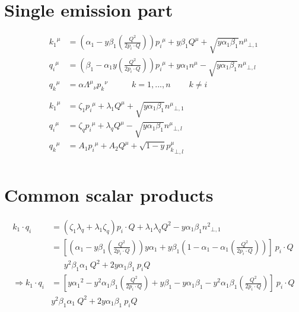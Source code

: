 \section{Single emission part}
\begin{equation}
	\begin{aligned}
	{k_1}^{\mu} &= (\alpha_1 -y\beta_1(\frac{Q^2}{2p_i \cdot Q})) {p_i}^{\mu} + y\beta_1{Q}^{\mu} + \sqrt{y\alpha_1\beta_1}{n^{\mu}}_{\bot,1}  \\
	{q_i}^{\mu}   &= (\beta_1 -\alpha_1 y(\frac{Q^2}{2p_i \cdot Q})){p_i}^{\mu} + y\alpha_1{n}^{\mu} - \sqrt{y\alpha_1\beta_1}{n^{\mu}}_{\bot,l} \\
	{q_k}^{\mu} &= \alpha {\Lambda^{\mu}}_{\nu}{p_k}^{\nu} \:\:\:\:\:\:\:\:\:\:\:\:\: {k=1,...,n}\:\:\:\:\:\:\:\:\:\:k\neq i\\
	\\
	\\
		{k_1}^{\mu} &= \zeta_1 {p_i}^{\mu} + \lambda_1{Q}^{\mu} + \sqrt{y\alpha_1\beta_1}{n^{\mu}}_{\bot,1}  \\
	{q_i}^{\mu}   &= \zeta_q{p_i}^{\mu} + \lambda_q{Q}^{\mu} - \sqrt{y\alpha_1\beta_1}{n^{\mu}}_{\bot,l} \\
	{q_k}^{\mu} &= A_1{p_i}^{\mu} + A_2{Q}^{\mu} + \sqrt{1-y}{p_k^{\mu}}_{\bot,l}\\
    \end{aligned}
\end{equation}
\section{Common scalar products}
\begin{equation}
	\begin{aligned}	
k_1 \cdot q_i &= (\zeta_1 \lambda_q + \lambda_1 \zeta_q)p_i \cdot Q+\lambda_1 \lambda_q Q^2 -y\alpha_1\beta_1 {n^{2}}_{\bot,1}\\
	&=[(\alpha_1 -y\beta_1(\frac{Q^2}{2p_i \cdot Q}))y\alpha_1+y\beta_1(1- \alpha_1 -\alpha_1 (\frac{Q^2}{2p_i \cdot Q}))]\:p_i \cdot Q\\
	&\:\:\:\:\:\:\:y^2\beta_1\alpha_1\: Q^2+2y\alpha_1\beta_1\:p_iQ\\
\Rightarrow	k_1 \cdot q_i &=[y{\alpha_1}^2 -y^2\alpha_1\beta_1(\frac{Q^2}{2p_i \cdot Q})+y\beta_1- y\alpha_1\beta_1-y^2\alpha_1\beta_1(\frac{Q^2}{2p_i \cdot Q})]\:p_i\cdot Q\\
	&y^2\beta_1\alpha_1\: Q^2+2y\alpha_1\beta_1\:p_iQ\\	
    \end{aligned}
\end{equation}

